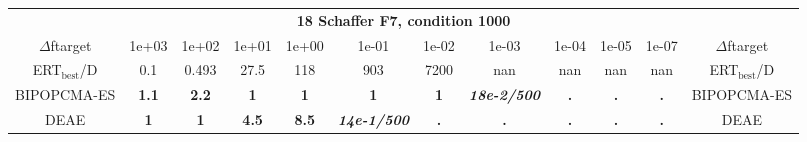 \begin{tabular}{cccccccccccc}
 & \multicolumn{10}{c}{{\normalsize \textbf{18 Schaffer F7, condition 1000}}}\\
$\Delta$ftarget& 1e+03& 1e+02& 1e+01& 1e+00& 1e-01& 1e-02& 1e-03& 1e-04& 1e-05& 1e-07 & $\Delta$ftarget \\
ERT$_{\textrm{best}}$/D& 0.1& 0.493& 27.5& 118& 903& 7200& nan& nan& nan& nan & ERT$_{\textrm{best}}$/D \\
\hline
BIPOPCMA-ES & \textbf{1.1} & \textbf{2.2} & \textbf{1} & \textbf{1} & \textbf{1} & \textbf{1} & \textbf{\textit{18e-2}\textit{/500}} & \textbf{.} & \textbf{.} & \textbf{.} & BIPOPCMA-ES \cite{add_an_entry_for_BIPOPCMA-ES_in_bbob.bib}\\
DEAE & \textbf{1} & \textbf{1} & \textbf{4.5} & \textbf{8.5} & \textbf{\textit{14e-1}\textit{/500}} & \textbf{.} & \textbf{.} & \textbf{.} & \textbf{.} & \textbf{.} & DEAE \cite{add_an_entry_for_DEAE_in_bbob.bib}
\end{tabular}
